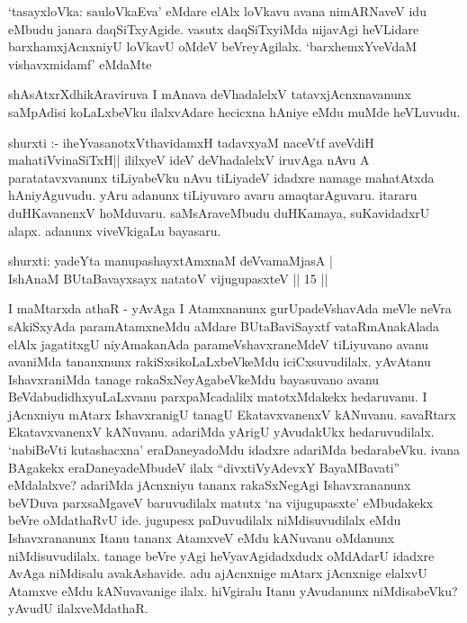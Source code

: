 \begin{artha}
`tasayxloVka: sauloVkaEva' eMdare elAlx loVkavu avana nimARNaveV idu eMbudu janara daqSiTxyAgide. vasutx daqSiTxyiMda nijavAgi heVLidare barxhamxjAcnxniyU loVkavU oMdeV beVreyAgilalx. `barxhemxYveVdaM vishavxmidamf' eMdaMte
\end{artha}

\begin{artha}
shAsAtxrXdhikAraviruva I mAnava deVhadalelxV tatavxjAcnxnavanunx saMpAdisi koLaLxbeVku ilalxvAdare hecicxna hAniye eMdu muMde heVLuvudu.
\end{artha}

\begin{artha}
shurxti :- iheYvasanotxV\s thavidamxH tadavxyaM naceVtf aveVdiH mahatiVvinaSiTxH|| ililxyeV ideV deVhadalelxV iruvAga nAvu A paratatavxvanunx tiLiyabeVku nAvu tiLiyadeV idadxre namage mahatAtxda hAniyAguvudu. yAru adanunx tiLiyuvaro avaru amaqtarAguvaru. itararu duHKavanenxV hoMduvaru. saMsAraveMbudu duHKamaya, suKavidadxrU alapx. adanunx viveVkigaLu bayasaru.
\end{artha}


\begin{shl}
shurxti: yadeYta manupashayxtAmxnaM deVvamaMjasA |\\
IshAnaM BUtaBavayxsayx natatoV vijugupasxteV || 15 ||
\end{shl}

\begin{artha}
I maMtarxda athaR - yAvAga I Atamxnanunx gurUpadeVshavAda meVle neVra sAkiSxyAda paramAtamxneMdu aMdare BUtaBaviSayxtf vataRmAnakAlada elAlx jagatitxgU niyAmakanAda parameVshavxraneMdeV tiLiyuvano avanu avaniMda tananxnunx rakiSxsikoLaLxbeVkeMdu iciCxsuvudilalx. yAvAtanu IshavxraniMda tanage rakaSxNeyAgabeVkeMdu bayasuvano avanu BeVdabudidhxyuLaLxvanu parxpaMcadalilx matotxMdakekx hedaruvanu. I jAcnxniyu mAtarx IshavxranigU tanagU EkatavxvanenxV kANuvanu. savaRtarx EkatavxvanenxV kANuvanu. adariMda yArigU yAvudakUkx hedaruvudilalx. `nabiBeVti kutashacxna' eraDaneyadoMdu idadxre adariMda bedarabeVku. ivana BAgakekx eraDaneyadeMbudeV ilalx ``divxtiVyAdevxY BayaMBavati'' eMdalalxve? adariMda jAcnxniyu tananx rakaSxNegAgi Ishavxrananunx beVDuva parxsaMgaveV baruvudilalx matutx `na vijugupasxte' eMbudakekx beVre oMdathaRvU ide. jugupesx paDuvudilalx niMdisuvudilalx eMdu Ishavxrananunx Itanu tananx AtamxveV eMdu kANuvanu oMdanunx niMdisuvudilalx. tanage beVre yAgi heVyavAgidadxdudx oMdAdarU idadxre AvAga niMdisalu avakAshavide. adu ajAcnxnige mAtarx jAcnxnige elalxvU Atamxve eMdu kANuvavanige ilalx. hiVgiralu Itanu yAvudanunx niMdisabeVku? yAvudU ilalxveMdathaR.
\end{artha}

